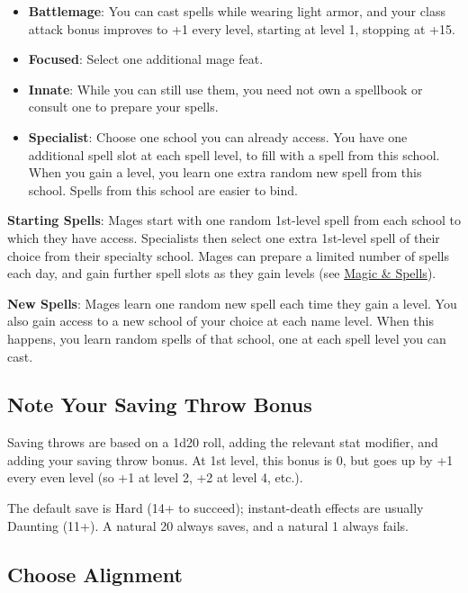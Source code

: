 \documentclass{article}
\begin{document}
\begin{multicols}{2}
\begin{itemize}
\tightlist
\item
  \textbf{Battlemage}: You can cast spells while wearing light armor,
  and your class attack bonus improves to +1 every level, starting at
  level 1, stopping at +15.
\item
  \textbf{Focused}: Select one additional mage feat.
\item
  \textbf{Innate}: While you can still use them, you need not own a
  spellbook or consult one to prepare your spells.
\item
  \textbf{Specialist}: Choose one school you can already access. You
  have one additional spell slot at each spell level, to fill with a
  spell from this school. When you gain a level, you learn one extra
  random new spell from this school. Spells from this school are easier
  to bind.
\end{itemize}

\textbf{Starting Spells}: Mages start with one random 1st-level spell
from each school to which they have access. Specialists then select one
extra 1st-level spell of their choice from their specialty school. Mages
can prepare a limited number of spells each day, and gain further spell
slots as they gain levels (see \hyperref[magic-spells]{Magic \&
Spells}).

\textbf{New Spells}: Mages learn one random new spell each time they
gain a level. You also gain access to a new school of your choice at
each name level. When this happens, you learn random spells of that
school, one at each spell level you can cast.

\subsection{Note Your Saving Throw
Bonus}\label{note-your-saving-throw-bonus}

Saving throws are based on a 1d20 roll, adding the relevant stat
modifier, and adding your saving throw bonus. At 1st level, this bonus
is 0, but goes up by +1 every even level (so +1 at level 2, +2 at level
4, etc.).

The default save is Hard (14+ to succeed); instant-death effects are
usually Daunting (11+). A natural 20 always saves, and a natural 1
always fails.

\subsection{Choose Alignment}\label{choose-alignment}


\end{multicols}
\end{document}
